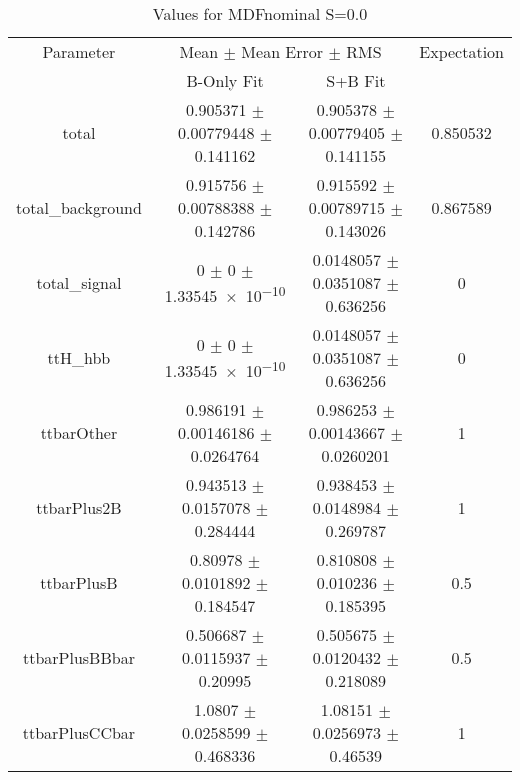 \begin{table}
\centering
\caption{Values for MDFnominal S=0.0}
\begin{tabular}{cccc}
\toprule
Parameter & \multicolumn{2}{c}{Mean $\pm$ Mean Error $\pm$ RMS} & Expectation\\
 & B-Only Fit & S+B Fit & \\
\midrule
total & \num{0.905371} $\pm$ \num{0.00779448} $\pm$ \num{0.141162} & \num{0.905378} $\pm$ \num{0.00779405} $\pm$ \num{0.141155} & \num{0.850532}\\
total\_background & \num{0.915756} $\pm$ \num{0.00788388} $\pm$ \num{0.142786} & \num{0.915592} $\pm$ \num{0.00789715} $\pm$ \num{0.143026} & \num{0.867589}\\
total\_signal & \num{0} $\pm$ \num{0} $\pm$ \num{1.33545e-10} & \num{0.0148057} $\pm$ \num{0.0351087} $\pm$ \num{0.636256} & \num{0}\\
ttH\_hbb & \num{0} $\pm$ \num{0} $\pm$ \num{1.33545e-10} & \num{0.0148057} $\pm$ \num{0.0351087} $\pm$ \num{0.636256} & \num{0}\\
ttbarOther & \num{0.986191} $\pm$ \num{0.00146186} $\pm$ \num{0.0264764} & \num{0.986253} $\pm$ \num{0.00143667} $\pm$ \num{0.0260201} & \num{1}\\
ttbarPlus2B & \num{0.943513} $\pm$ \num{0.0157078} $\pm$ \num{0.284444} & \num{0.938453} $\pm$ \num{0.0148984} $\pm$ \num{0.269787} & \num{1}\\
ttbarPlusB & \num{0.80978} $\pm$ \num{0.0101892} $\pm$ \num{0.184547} & \num{0.810808} $\pm$ \num{0.010236} $\pm$ \num{0.185395} & \num{0.5}\\
ttbarPlusBBbar & \num{0.506687} $\pm$ \num{0.0115937} $\pm$ \num{0.20995} & \num{0.505675} $\pm$ \num{0.0120432} $\pm$ \num{0.218089} & \num{0.5}\\
ttbarPlusCCbar & \num{1.0807} $\pm$ \num{0.0258599} $\pm$ \num{0.468336} & \num{1.08151} $\pm$ \num{0.0256973} $\pm$ \num{0.46539} & \num{1}\\
\bottomrule
\end{tabular}
\end{table}